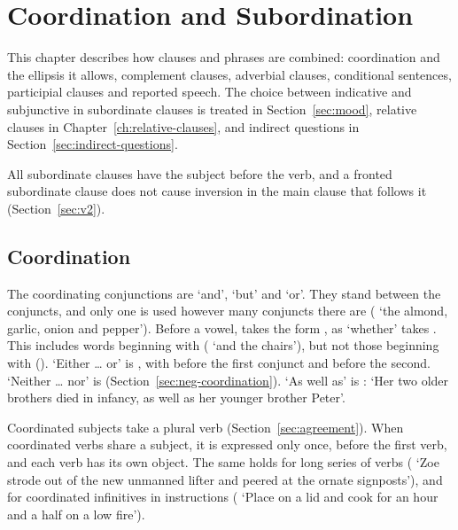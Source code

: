 \chapter{Coordination and Subordination}\label{ch:complex-sentences}

This chapter describes how clauses and phrases are combined: coordination and the ellipsis it allows, complement clauses, adverbial clauses, conditional sentences, participial clauses and reported speech. The choice between indicative and subjunctive in subordinate clauses is treated in Section~\ref{sec:mood}, relative clauses in Chapter~\ref{ch:relative-clauses}, and indirect questions in Section~\ref{sec:indirect-questions}.

All subordinate clauses have the subject before the verb, and a fronted subordinate clause does not cause inversion in the main clause that follows it (Section~\ref{sec:v2}).

\section{Coordination}\label{sec:coordination}
The coordinating conjunctions are  `and',  `but' and  `or'. They stand between the conjuncts, and only one is used however many conjuncts there are ( `the almond, garlic, onion and pepper'). Before a vowel,  takes the form , as  `whether' takes . This includes words beginning with  ( `and the chairs'), but not those beginning with  ().
`Either \ldots{} or' is , with  before the first conjunct and  before the second. `Neither \ldots{} nor' is  (Section~\ref{sec:neg-coordination}).
`As well as' is :  `Her two older brothers died in infancy, as well as her younger brother Peter'.

Coordinated subjects take a plural verb (Section~\ref{sec:agreement}). When coordinated verbs share a subject, it is expressed only once, before the first verb, and each verb has its own object.
The same holds for long series of verbs ( `Zoe strode out of the new unmanned lifter and peered at the ornate signposts'), and for coordinated infinitives in instructions ( `Place on a lid and cook for an hour and a half on a low fire').

